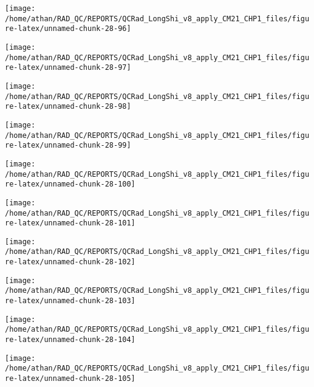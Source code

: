 \documentclass[
  10pt,
  a4paper,oneside]{article}
\begin{document}
\begin{center}\texttt{[image: /home/athan/RAD\_QC/REPORTS/QCRad\_LongShi\_v8\_apply\_CM21\_CHP1\_files/figure-latex/unnamed-chunk-28-96]} \end{center}

\begin{center}\texttt{[image: /home/athan/RAD\_QC/REPORTS/QCRad\_LongShi\_v8\_apply\_CM21\_CHP1\_files/figure-latex/unnamed-chunk-28-97]} \end{center}

\begin{center}\texttt{[image: /home/athan/RAD\_QC/REPORTS/QCRad\_LongShi\_v8\_apply\_CM21\_CHP1\_files/figure-latex/unnamed-chunk-28-98]} \end{center}

\begin{center}\texttt{[image: /home/athan/RAD\_QC/REPORTS/QCRad\_LongShi\_v8\_apply\_CM21\_CHP1\_files/figure-latex/unnamed-chunk-28-99]} \end{center}

\begin{center}\texttt{[image: /home/athan/RAD\_QC/REPORTS/QCRad\_LongShi\_v8\_apply\_CM21\_CHP1\_files/figure-latex/unnamed-chunk-28-100]} \end{center}

\begin{center}\texttt{[image: /home/athan/RAD\_QC/REPORTS/QCRad\_LongShi\_v8\_apply\_CM21\_CHP1\_files/figure-latex/unnamed-chunk-28-101]} \end{center}

\begin{center}\texttt{[image: /home/athan/RAD\_QC/REPORTS/QCRad\_LongShi\_v8\_apply\_CM21\_CHP1\_files/figure-latex/unnamed-chunk-28-102]} \end{center}

\begin{center}\texttt{[image: /home/athan/RAD\_QC/REPORTS/QCRad\_LongShi\_v8\_apply\_CM21\_CHP1\_files/figure-latex/unnamed-chunk-28-103]} \end{center}

\begin{center}\texttt{[image: /home/athan/RAD\_QC/REPORTS/QCRad\_LongShi\_v8\_apply\_CM21\_CHP1\_files/figure-latex/unnamed-chunk-28-104]} \end{center}

\begin{center}\texttt{[image: /home/athan/RAD\_QC/REPORTS/QCRad\_LongShi\_v8\_apply\_CM21\_CHP1\_files/figure-latex/unnamed-chunk-28-105]} \end{center}
\end{document}
